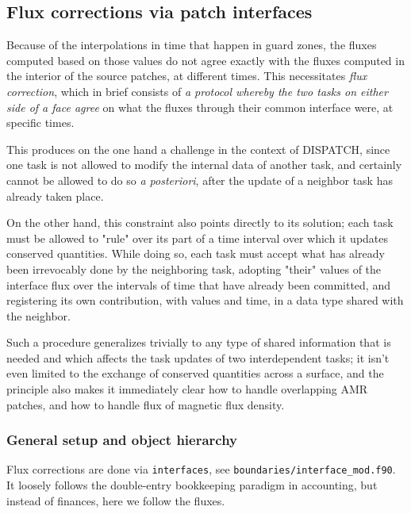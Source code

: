 \documentclass[paper=a4,fontsize=11pt]{scrartcl}
\numberwithin{equation}{section}		%
\numberwithin{figure}{section}			%
\numberwithin{table}{section}				%
\newcommand{\codecolor}{\color{Blue}}
\newcommand{\filecolor}{\color{NavyBlue}}
\newcommand{\File}[1]{{\filecolor\texttt{#1}}}
\newcommand{\Code}[1]{{\codecolor\texttt{#1}}}
\begin{document}
\subsection{Flux corrections via patch interfaces}
Because of the interpolations in time that happen in guard zones, the fluxes computed based on those values do not agree exactly with the fluxes computed in the interior of the source patches, at different times.  This necessitates \textit{flux correction}, which in brief consists of \textit{a protocol whereby the two tasks on either side of a face agree} on what the fluxes through their common interface were, at specific times.

This produces on the one hand a challenge in the context of DISPATCH, since one task is not allowed to modify the internal data of another task, and certainly cannot be allowed to do so \textit{a posteriori}, after the update of a neighbor task has already taken place.

On the other hand, this constraint also points directly to its solution; each task must be allowed to "rule" over its part of a time interval over which it updates conserved quantities.  While doing so, each task must accept what has already been irrevocably done by the neighboring task, adopting "their" values of the interface flux over the intervals of time that have already been committed, and registering its own contribution, with values and time, in a data type shared with the neighbor.

Such a procedure generalizes trivially to any type of shared information that is needed and which affects the task updates of two interdependent tasks; it isn't even limited to the exchange of conserved quantities across a surface, and the principle also makes it immediately clear how to handle overlapping AMR patches, and how to handle flux of magnetic flux density.

\subsubsection{General setup and object hierarchy}
Flux corrections are done via \Code{interfaces}, see \File{boundaries/interface\_mod.f90}. It loosely follows the double-entry bookkeeping paradigm in accounting, but instead of finances, here we follow the fluxes.
\end{document}
